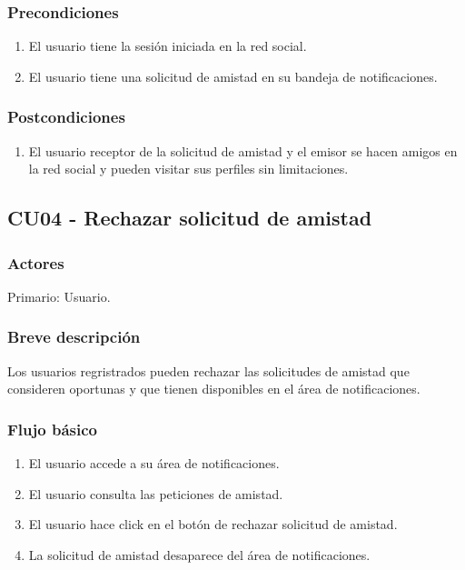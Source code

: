 \documentclass[12pt, a4paper, titlepage]{article}
\begin{document}
\subsubsection{Precondiciones}
\begin{enumerate}
	\item El usuario tiene la sesión iniciada en la red social.
	\item El usuario tiene una solicitud de amistad en su bandeja de notificaciones.
\end{enumerate}
\subsubsection{Postcondiciones}
\begin{enumerate}
	\item El usuario receptor de la solicitud de amistad y el emisor se hacen amigos en la red social y pueden visitar sus perfiles sin limitaciones.
\end{enumerate}


\subsection{CU04 - Rechazar solicitud de amistad}
\subsubsection{Actores}
Primario: Usuario.
\subsubsection{Breve descripción}
Los usuarios regristrados pueden rechazar las solicitudes de amistad que consideren oportunas y que tienen disponibles en el área de notificaciones.
\subsubsection{Flujo básico}
\begin{enumerate}
	\item El usuario accede a su área de notificaciones.
	\item El usuario consulta las peticiones de amistad.
	\item El usuario hace click en el botón de rechazar solicitud de amistad.
	\item La solicitud de amistad desaparece del área de notificaciones.
\end{enumerate}
\end{document}
